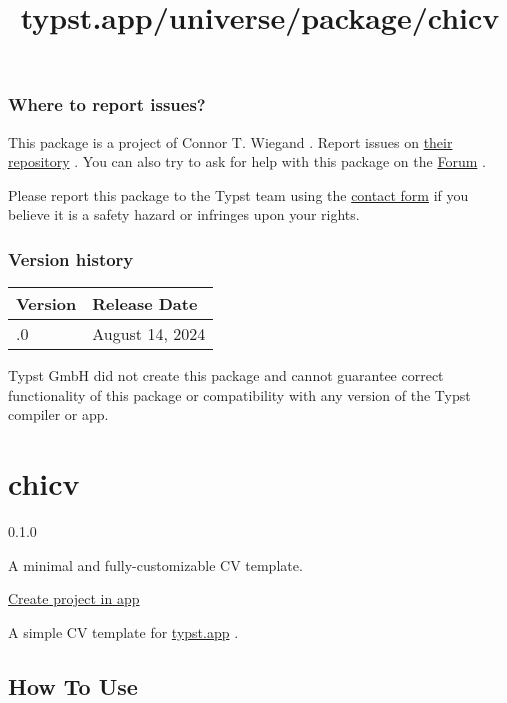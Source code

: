 \subsubsection{Where to report issues?}\label{where-to-report-issues}

This package is a project of Connor T. Wiegand . Report issues on
\href{https://github.com/connortwiegand/game-theoryst}{their repository}
. You can also try to ask for help with this package on the
\href{https://forum.typst.app}{Forum} .

Please report this package to the Typst team using the
\href{https://typst.app/contact}{contact form} if you believe it is a
safety hazard or infringes upon your rights.

\label{versions}
\subsubsection{Version history}\label{version-history}

\begin{longtable}[]{@{}ll@{}}
\toprule\noalign{}
Version & Release Date \\
\midrule\noalign{}
\endhead
\bottomrule\noalign{}
\endlastfoot
0.1.0 & August 14, 2024 \\
\end{longtable}

Typst GmbH did not create this package and cannot guarantee correct
functionality of this package or compatibility with any version of the
Typst compiler or app.


\title{typst.app/universe/package/chicv}

\label{banner}
\label{template-thumbnail}

\section{chicv}\label{chicv}

{ 0.1.0 }

A minimal and fully-customizable CV template.

\href{/app?template=chicv&version=0.1.0}{Create project in app}

\label{readme}
A simple CV template for \href{https://typst.app/}{typst.app} .

\subsection{How To Use}\label{how-to-use}


